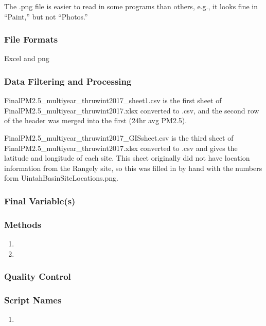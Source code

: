 The .png file is easier to read in some programs than others, e.g., it looks fine in ``Paint,'' but not ``Photos.''

\subsubsection*{File Formats} 
Excel and png

\subsubsection*{Data Filtering and Processing}
FinalPM2.5\_multiyear\_thruwint2017\_sheet1.csv is the first sheet of FinalPM2.5\_multiyear\_thruwint2017.xlsx converted to .csv, and the second row of the header was merged into the first (24hr avg PM2.5).

FinalPM2.5\_multiyear\_thruwint2017\_GISsheet.csv is the third sheet of FinalPM2.5\_multiyear\_thruwint2017.xlsx converted to .csv and gives the latitude and longitude of each site. This sheet originally did not have location information from the Rangely site, so this was filled in by hand with the numbers form UintahBasinSiteLocations.png.


\subsubsection*{Final Variable(s)}

\subsubsection*{Methods}

\begin{enumerate}
\item 
\item
\end{enumerate}

\subsubsection*{Quality Control}

\subsubsection*{Script Names}

\begin{enumerate}
\item 
\end{enumerate}

